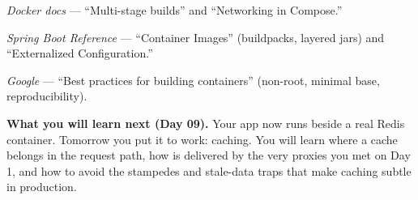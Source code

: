 \begin{wbitem}
  \item \emph{Docker docs} --- ``Multi-stage builds'' and ``Networking in Compose.''
  \item \emph{Spring Boot Reference} --- ``Container Images'' (buildpacks, layered jars) and ``Externalized Configuration.''
  \item \emph{Google} --- ``Best practices for building containers'' (non-root, minimal base, reproducibility).
\end{wbitem}

\begin{keyidea}
\textbf{What you will learn next (Day 09).} Your app now runs beside a real Redis container. Tomorrow you put it to work: caching. You will learn where a cache belongs in the request path, how  is delivered by the very proxies you met on Day 1, and how to avoid the stampedes and stale-data traps that make caching subtle in production.
\end{keyidea}
